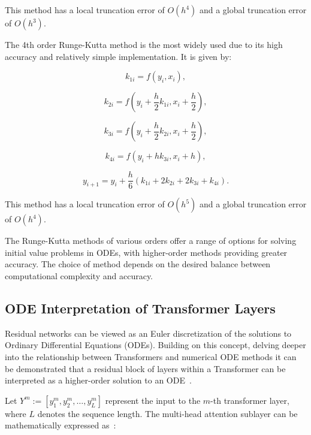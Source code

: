 \documentclass[12pt,a4paper]{report}
\begin{document}
This method has a local truncation error of \( O(h^4) \) and a global truncation error of \( O(h^3) \).

The 4th order Runge-Kutta method is the most widely used due to its high accuracy and relatively simple implementation. It is given by:

\begin{equation}
  k_{1i} = f(y_i, x_i),
\end{equation}

\begin{equation}
  k_{2i} = f\left(y_i + \frac{h}{2} k_{1i}, x_i + \frac{h}{2}\right),
\end{equation}

\begin{equation}
  k_{3i} = f\left(y_i + \frac{h}{2} k_{2i}, x_i + \frac{h}{2}\right),
\end{equation}

\begin{equation}
  k_{4i} = f(y_i + h k_{3i}, x_i + h),
\end{equation}

\begin{equation}
  y_{i+1} = y_i + \frac{h}{6} (k_{1i} + 2k_{2i} + 2k_{3i} + k_{4i}).
\end{equation}

This method has a local truncation error of \( O(h^5) \) and a global truncation error of \( O(h^4) \).

The Runge-Kutta methods of various orders offer a range of options for solving initial value problems in ODEs, with higher-order methods providing greater accuracy. The choice of method depends on the desired balance between computational complexity and accuracy.

\subsection{ODE Interpretation of Transformer Layers}
Residual networks can be viewed as an Euler discretization of the solutions to Ordinary Differential Equations (ODEs). Building on this concept, delving deeper into the relationship between Transformers and numerical ODE methods it can be demonstrated that a residual block of layers within a Transformer can be interpreted as a higher-order solution to an ODE~\cite{li2022ode}.

Let \( Y^m := [y_1^m, y_2^m, \ldots, y_L^m] \) represent the input to the \( m \)-th transformer layer, where \( L \) denotes the sequence length. The multi-head attention sublayer can be mathematically expressed as~\cite{zhong2022neural}:
\end{document}
